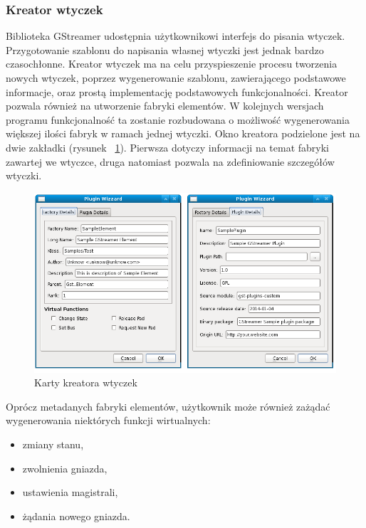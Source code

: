\documentclass[12pt]{article}
\begin{document}
\subsubsection{Kreator wtyczek}
Biblioteka GStreamer udostępnia użytkownikowi interfejs do pisania wtyczek. Przygotowanie szablonu do napisania własnej wtyczki jest jednak bardzo czasochłonne. Kreator wtyczek ma na celu przyspieszenie procesu tworzenia nowych wtyczek, poprzez wygenerowanie szablonu, zawierającego podstawowe informacje, oraz prostą implementację podstawowych funkcjonalności.
Kreator pozwala również na utworzenie fabryki elementów. W kolejnych wersjach programu funkcjonalność ta zostanie rozbudowana o możliwość wygenerowania większej ilości fabryk w ramach jednej wtyczki.
Okno kreatora podzielone jest na dwie zakładki (rysunek ~\ref{fig:pluginWizzard}). Pierwsza dotyczy informacji na temat fabryki zawartej we wtyczce, druga natomiast pozwala na zdefiniowanie szczegółów wtyczki.
\begin{figure}[H]
  \includegraphics[width=155mm]{img/plugin-wizzard.png}
  \caption{Karty kreatora wtyczek}
  \label{fig:pluginWizzard}
\end{figure}

\noindent
Oprócz metadanych fabryki elementów, użytkownik może również zażądać wygenerowania niektórych funkcji wirtualnych:
\begin{itemize}
  \setlength{\itemsep}{0em}
\item zmiany stanu,
\item zwolnienia gniazda,
\item ustawienia magistrali,
\item żądania nowego gniazda.
\end{itemize}
\end{document}
